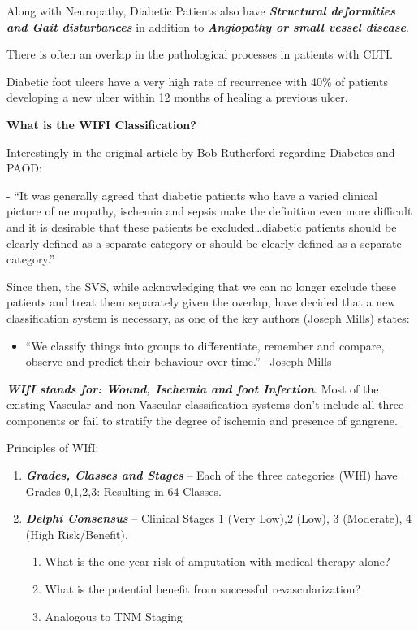 \documentclass[
]{book}
\providecommand{\tightlist}{%
  \setlength{\itemsep}{0pt}\setlength{\parskip}{0pt}}
\begin{document}
Along with Neuropathy, Diabetic Patients also have \textbf{\emph{Structural
deformities and Gait disturbances}} in addition to \textbf{\emph{Angiopathy or small
vessel disease}}.

There is often an overlap in the pathological processes in patients with
CLTI.

Diabetic foot ulcers have a very high rate of recurrence with 40\% of
patients developing a new ulcer within 12 months of healing a previous
ulcer. \citep{armstrong2017}

\textbf{What is the WIFI Classification?} \citep{millsSocietyVascularSurgery2014a}

Interestingly in the original article by Bob Rutherford regarding
Diabetes and PAOD:

- ``It was generally agreed that diabetic patients who have a varied
clinical picture of neuropathy, ischemia and sepsis make the definition
even more difficult and it is desirable that these patients be
excluded\ldots diabetic patients should be clearly defined as a separate
category or should be clearly defined as a separate category.''

Since then, the SVS, while acknowledging that we can no longer exclude
these patients and treat them separately given the overlap, have decided
that a new classification system is necessary, as one of the key authors
(Joseph Mills) states:

\begin{itemize}
\tightlist
\item
  ``We classify things into groups to differentiate, remember and
  compare, observe and predict their behaviour over time.'' --Joseph
  Mills
\end{itemize}

\textbf{\emph{WIfI stands for: Wound, Ischemia and foot Infection}}. Most of the
existing Vascular and non-Vascular classification systems don't include
all three components or fail to stratify the degree of ischemia and
presence of gangrene.

Principles of WIfI:

\begin{enumerate}
\def\labelenumi{\arabic{enumi}.}
\item
  \textbf{\emph{Grades, Classes and Stages}} -- Each of the three categories (WIfI)
  have Grades 0,1,2,3: Resulting in 64 Classes.
\item
  \textbf{\emph{Delphi Consensus}} -- Clinical Stages 1 (Very Low),2 (Low), 3
  (Moderate), 4 (High Risk/Benefit).

  \begin{enumerate}
  \def\labelenumii{\arabic{enumii}.}
  \item
    What is the one-year risk of amputation with medical therapy
    alone?
  \item
    What is the potential benefit from successful revascularization?
  \item
    Analogous to TNM Staging
  \end{enumerate}
\end{enumerate}
\end{document}
